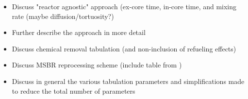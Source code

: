 \begin{itemize}
    \item Discuss "reactor agnostic" approach (ex-core time, in-core time, and mixing rate (maybe diffusion/tortuosity?)
    \item Further describe the approach in more detail
    \item Discuss chemical removal tabulation (and non-inclusion of refueling effects)
    \item Discuss \gls{MSBR} reprocessing scheme (include table from \cite{robertson_conceptual_1971})
    \item Discuss in general the various tabulation parameters and simplifications made to reduce the total number of parameters
\end{itemize}

